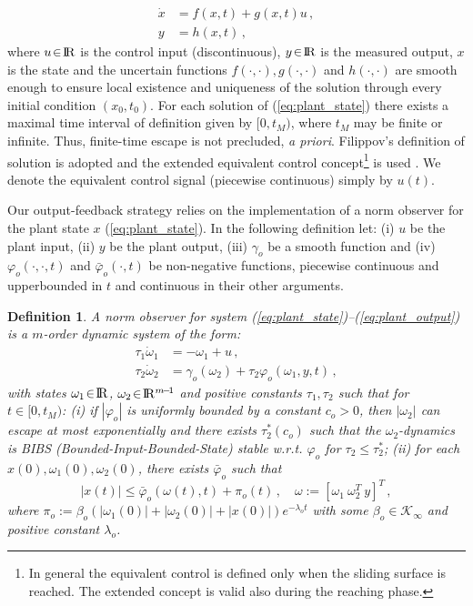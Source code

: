 \documentclass{rncauth}
\newtheorem{definition}{Definition}
\def\re{{\rm I}\! {\rm R}}
\begin{document}
%
\begin{align}
    \dot{x} &= f(x,t) + g(x,t) u\,, \label{eq:plant_state} \\
    y &= h(x,t)\,,\label{eq:plant_output}
\end{align}
%
where $u\!\in\!\re$ is the control input (discontinuous),
$y\!\in\!\re$ is the measured output, $x$ is the state and the
uncertain functions $f(\cdot,\cdot), g(\cdot,\cdot)$ and
$h(\cdot,\cdot)$ are smooth enough to ensure local existence and
uniqueness of the solution
through every initial condition $(x_0,t_0)$. For each solution of (\ref{eq:plant_state}) there exists a maximal
time interval of definition given by $[0,t_M)$, where $t_M$ may be
finite or infinite. Thus, finite-time escape is not precluded, {\em
a priori}. Filippov's definition of solution is adopted \cite{F:64}
and the extended equivalent control concept\footnote{In general the
equivalent control is defined only when the sliding surface is
reached. The extended concept is valid also during the reaching
phase.} is used \cite[Section~2.3]{HCCL:2002a} \cite{U:78}. We
denote the equivalent control signal (piecewise continuous) simply
by $u(t)$.

Our output-feedback strategy relies on the implementation of a
norm observer for the plant state $x$ (\ref{eq:plant_state}). In
the following definition let: (i) $u$ be the plant input, (ii) $y$
be the plant output, (iii)
$\gamma_o$ be a smooth function %
and (iv) $\varphi_o(\cdot,\cdot,t)$ and $\bar{\varphi}_o(\cdot,t)$
be  non-negative functions, piecewise continuous and upperbounded
in $t$ and continuous in their other arguments.
%
\begin{definition}\label{def:NO}
A norm observer for system
(\ref{eq:plant_state})--(\ref{eq:plant_output}) is a $m$-order
dynamic system of the form:
%
\begin{align}
\tau_1 \dot{\omega}_1 &= -\omega_1+u\,, \label{eq:defuav} \\
\tau_2 \dot{\omega}_2 &=
\gamma_o(\omega_2)+\tau_2\varphi_o(\omega_1,y,t)\,,\label{eq:normobsgeneric}
\end{align}
%
with states $\omega_1\!\in\!\re$, $\omega_2\!\in\!\re^{m\!-\!1}$ and
positive constants $\tau_1, \tau_2$ such that for $t\in[0,t_M)$: (i)
if $|\varphi_o|$ is uniformly bounded by a constant $c_o\!>\!0$,
then $|\omega_2|$ can escape at most exponentially and there exists
$\tau_2^*(c_o)$ such that the $\omega_2$-dynamics is BIBS
(Bounded-Input-Bounded-State) stable w.r.t. $\varphi_o$ for
$\tau_2\leq \tau_2^*$; (ii)
for each $x(0),\omega_1(0),\omega_2(0)$, there exists $\bar{\varphi}_o$ such that
%
\begin{equation}
|x(t)| \leq \bar{\varphi}_o(\omega(t),t) + \pi_o(t) \,, \quad
\omega:=[\omega_1 \ \omega_2^T \ y]^T\,,\label{eq:xboundfromw}
\end{equation}
%
where
$\pi_o:=\beta_o(|\omega_1(0)|\!+\!|\omega_2(0)|\!+\!|x(0)|)e^{-\lambda_o
t}$ with some $\beta_o \in \mathcal{K}_\infty$ and positive
constant $\lambda_o$.
\end{definition}
%
\end{document}
